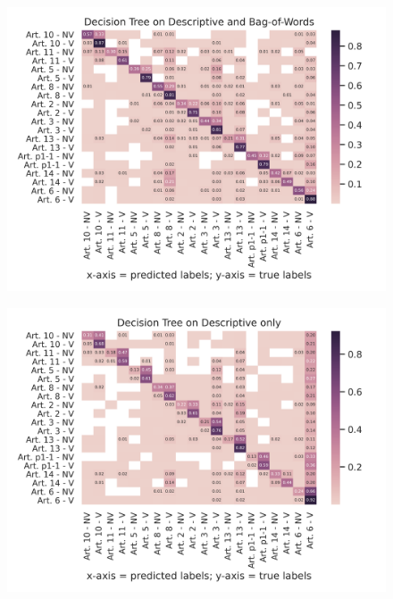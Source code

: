\documentclass{article}
\begin{document}
\begin{figure}[!htb]
    \centering
    \includegraphics[scale=0.7]{data/analysis/cm/multiclass_cm_test_decision_tree_descriptive_and_bag-of-words.png}  
\end{figure}
\begin{figure}[!htb]
    \centering
    \includegraphics[scale=0.7]{data/analysis/cm/multiclass_cm_test_decision_tree_descriptive_only.png}  
\end{figure}
\end{document}
